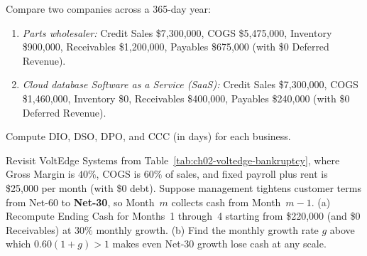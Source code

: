 \begin{exercise}
\label{ex:ch02-ccc-comparison}
Compare two companies across a 365-day year:
\begin{enumerate}
  \item \emph{Parts wholesaler:} Credit Sales \$7,300,000, COGS \$5,475,000, Inventory \$900,000, Receivables \$1,200,000, Payables \$675,000 (with \$0 Deferred Revenue).
  \item \emph{Cloud database Software as a Service (SaaS):} Credit Sales \$7,300,000, COGS \$1,460,000, Inventory \$0, Receivables \$400,000, Payables \$240,000 (with \$0 Deferred Revenue).
\end{enumerate}
Compute $\text{DIO}$, $\text{DSO}$, $\text{DPO}$, and $\text{CCC}$ (in days) for each business.
\end{exercise}

\begin{exercise}
\label{ex:ch02-voltedge-net30}
Revisit VoltEdge Systems from Table~\ref{tab:ch02-voltedge-bankruptcy}, where Gross Margin is $40\%$, COGS is $60\%$ of sales, and fixed payroll plus rent is \$25,000 per month (with \$0 debt). Suppose management tightens customer terms from Net-60 to \textbf{Net-30}, so Month~$m$ collects cash from Month~$m-1$. (a) Recompute Ending Cash for Months~1 through~4 starting from \$220,000 (and \$0 Receivables) at $30\%$ monthly growth. (b) Find the monthly growth rate $g$ above which $0.60(1 + g) > 1$ makes even Net-30 growth lose cash at any scale.
\end{exercise}
